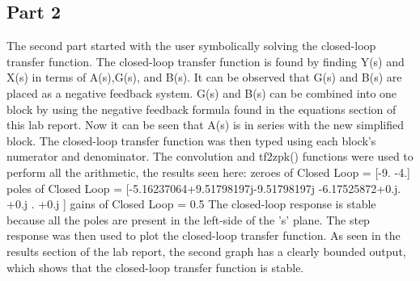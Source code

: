 \documentclass[12pt]{article}
\begin{document}
  \subsection{Part 2}
The second part started with the user symbolically solving the closed-loop transfer function. The closed-loop transfer function is found by finding Y(s) and X(s) in terms of A(s),G(s), and B(s). It can be observed that G(s) and B(s) are placed as a negative feedback system. G(s) and B(s) can be combined into one block by using the negative feedback formula found in the equations section of this lab report. Now it can be seen that A(s) is in series with the new simplified block.
The closed-loop transfer function was then typed using each block's numerator and denominator.\newline
The convolution and tf2zpk() functions were used to perform all the arithmetic, the results seen here:\newline
zeroes of Closed Loop =  [-9. -4.]\newline
poles of Closed Loop =  [-5.16237064+9.51798197j-9.51798197j -6.17525872+0.j.        +0.j  .        +0.j      ]\newline
gains of Closed Loop =  0.5\newline
The closed-loop response is stable because all the poles are present in the left-side of the 's' plane.\newline
The step response was then used to plot the closed-loop transfer function.\newline
As seen in the results section of the lab report, the second graph has a clearly bounded output, which shows that the closed-loop transfer function is stable.
\end{document}
